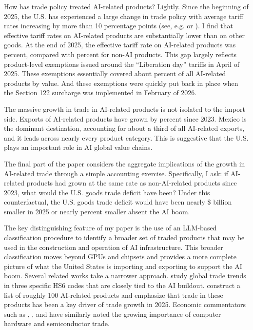 \documentclass[12pt,pdftex]{article}
\begin{document}
\begin{onehalfspacing}
How has trade policy treated AI-related products? Lightly. Since the beginning of 2025, the U.S. has experienced a large change in trade policy with average tariff rates increasing by more than 10 percentage points (see, e.g. \citet{waugh2026restrictive} or \citet{budgetlab2025tariffs}).  I find that effective tariff rates on AI-related products are substantially lower than on other goods. At the end of 2025, the effective tariff rate on AI-related products was \tariffHighTwentyFive{} percent, compared with \tariffLowTwentyFive{} percent for non-AI products. This gap largely reflects product-level exemptions issued around the ``Liberation day'' tariffs in April of 2025. These exemptions essentially covered about \exemptionAnyPct{} percent of all AI-related products by value. And these exemptions were quickly put back in place when the Section 122 surcharge was implemented in February of 2026.

The massive growth in trade in AI-related products is not isolated to the import side. Exports of AI-related products have grown by \aiExportGrowth{} percent since 2023. Mexico is the dominant destination, accounting for about a third of all AI-related exports, and it leads across nearly every product category. This is suggestive that the U.S. plays an important role in AI global value chains. 

The final part of the paper considers the aggregate implications of the growth in AI-related trade through a simple accounting exercise. Specifically, I ask: if AI-related products had grown at the same rate as non-AI-related products since 2023, what would the U.S. goods trade deficit have been? Under this counterfactual, the U.S. goods trade deficit would have been nearly \$\cfNetAiEffect{} billion smaller in 2025 or nearly \cfDeficitReductionPct{} percent smaller absent the AI boom. 

The key distinguishing feature of my paper is the use of an LLM-based classification procedure to identify a broader set of traded products that may be used in the construction and operation of AI infrastructure. This broader classification moves beyond GPUs and chipsets and provides a more complete picture of what the United States is importing and exporting to support the AI boom. Several related works take a narrower approach. \citet*{de2026global} study global trade trends in three specific HS6 codes that are closely tied to the AI buildout. \citet{wto2025gtos} construct a list of roughly 100 AI-related products and emphasize that trade in these products has been a key driver of trade growth in 2025. Economic commentators such as \citet{setser2026tradedeficit}, \citet{politano2025tariffexemption}, and \citet{swanson2026aitradedeficit} have similarly noted the growing importance of computer hardware and semiconductor trade. 


\end{onehalfspacing}
\end{document}
